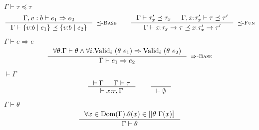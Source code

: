 \documentclass[10pt,a4paper]{article}
\newcommand\rulename[1]{\textsc{#1}\xspace}
\newcommand\rsubbase{\ensuremath{\preceq}\rulename{-Base}}
\newcommand\rsubfun{\ensuremath{\preceq}\rulename{-Fun}}
\newcommand\rsubcon{\ensuremath{\preceq}\rulename{-Con}}
\newcommand\rimpl{\ensuremath{\Rightarrow}\rulename{-Base}}
\newcommand\tref[3]{\ensuremath{\left\lbrace {#1} \colon {#2} \mid {#3} \right\rbrace}}
\newcommand\tconref[4]{\tref{#3}{\tcon{#1}{#2}}{#4}}
\newcommand\tcon[2]{\ensuremath{#1\ #2}}
\newcommand\tfun[3]{\ensuremath{#1\colon #2 \rightarrow #3}}
\newcommand\tfunref[5]{\tfun{#1}{#2}{#3}}
\newcommand\validi[1]{\ensuremath{\text{Valid}_{i}\ (#1)}}
\newcommand\generalconditionImpl[2]
	{\ensuremath{\forall i . \validi{#1} \Rightarrow \validi{#2}}}
\newcommand\interp[1]{\ensuremath{[|#1|]}}
\newcommand\iswellformed[2]{\ensuremath{#1 \vdash #2}}
\newcommand\issubtype[3]{\ensuremath{#1 \vdash #2 \preceq #3}}
\newcommand\issubref[3]{\ensuremath{#1 \vdash #2 \Rightarrow #3}}
\begin{document}
\hfill\mbox{\issubtype{\Gamma}{\tau}{\tau}}
$$
\inference{
	\issubref{\Gamma, v:b}{e_1}{e_2}
}{
	\issubtype{\Gamma}{\tref{v}{b}{e_1}}{\tref{v}{b}{e_2}}
}[\rsubbase]
\qquad
\inference{
	\issubtype{\Gamma}{\tau'_x}{\tau_x} &&
	\issubtype{\Gamma, x \colon \tau'_x}{\tau}{\tau'}
}{
	\issubtype{\Gamma}{\tfunref{x}{\tau_x}{\tau}{v}{e_1}}{\tfunref{x}{\tau'_x}{\tau'}{v}{e_2}}
}[\rsubfun]
$$

\hfill\mbox{\issubref{\Gamma}{e}{e}}
$$
\inference{
	\forall \theta. \iswellformed{\Gamma}{\theta} \land
	\generalconditionImpl{\theta\ e_1}{\theta\ e_2}
}{
	\issubref{\Gamma}{e_1}{e_2}
}[\rimpl]
$$

\hfill\mbox{\iswellformed{}{\Gamma}}
$$
\inference{
	\iswellformed{}{\Gamma} &&
	\iswellformed{\Gamma}{\tau}
}{
	\iswellformed{}{x\colon\tau,\Gamma}
}
\qquad
\inference{}{\iswellformed{}{\emptyset}}
$$


\hfill\mbox{\iswellformed{\Gamma}{\theta}}
$$
\inference{
	\forall x \in \text{Dom}(\Gamma). 
	\theta(x) \in \interp{\theta \ \Gamma(x)}
}{
	\iswellformed{\Gamma}{\theta}
}
$$
\end{document}
